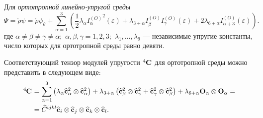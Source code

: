 
Для \textit{ортотропной линейно-упругой среды}
\begin{equation}
	\Psi = \mathring{\rho} \psi = \mathring{\rho} \psi_\theta + \sum\limits_{\alpha = 1}^{3} \left(\frac{1}{2} \lambda_\alpha {I^{(O)}_\alpha}^2(\varepsilon) + \lambda_{3 + \alpha} I^{(O)}_{\beta} I^{(O)}_\gamma(\varepsilon) + 2 \lambda_{6 + \alpha}I^{(O)}_{\alpha + 3}(\varepsilon)\right).
\end{equation}
где $\alpha \not= \beta \not = \gamma \not = \alpha;$ $\alpha, \beta, \gamma = 1, 2, 3;$ $\lambda_1, \dots, \lambda_9$ --- независимые упругие константы, число которых для ортотропной среды равно девяти. 

Соответствующий тензор модулей упругости $\tensor[^4]{\mathbf{C}}{}$ для ортотропной среды можно представить в следующем виде:
\begin{align}
	\tensor[^4]{\mathbf{C}}{} &= \sum_{\alpha = 1}^{3} \left(\lambda_\alpha \widehat{\mathbf{c}}^2_{\alpha} \otimes \widehat{\mathbf{c}}^2_{\alpha}\right) + \lambda_{3 + \alpha} \left(\widehat{\mathbf{c}}^2_{\beta} \otimes \widehat{\mathbf{c}}^2_{\gamma} + \widehat{\mathbf{c}}^2_{\gamma} \otimes \widehat{\mathbf{c}}^2_{\beta}\right) + \lambda_{6 + \alpha} \mathbf{O}_{\alpha} \otimes \mathbf{O}_{\alpha} = 
	\\
	&= \widehat{C}^{ijkl} \widehat{\mathbf{c}}_i \otimes \widehat{\mathbf{c}}_j \otimes \widehat{\mathbf{c}}_k \otimes \widehat{\mathbf{c}}_l.
\end{align}

